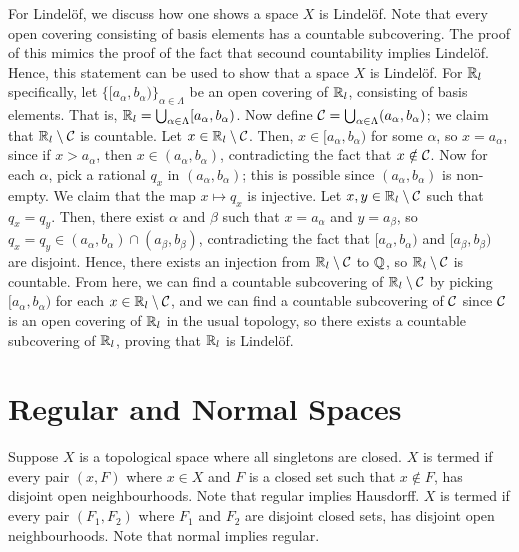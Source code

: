 For Lindel\"of, we discuss how one shows a space $X$ is Lindel\"of. Note that every open covering consisting of basis elements has a countable subcovering. The proof of this mimics the proof of the fact that secound countability implies Lindel\"of. Hence, this statement can be used to show that a space $X$ is Lindel\"of. For $\mathbb{R}_{l}$ specifically, let $\{[a_{\alpha},b_{\alpha})\}_{\alpha \in \Lambda}$ be an open covering of $\mathbb{R}_{l}$, consisting of basis elements. That is, $\mathbb{R}_{l} = \bigcup_{\alpha \in \Lambda} [a_{\alpha},b_{\alpha})$. Now define $\mathcal{C} = \bigcup_{\alpha \in \Lambda} (a_{\alpha},b_{\alpha})$; we claim that $\mathbb{R}_{l} \setminus \mathcal{C}$ is countable. Let $x \in \mathbb{R}_{l} \setminus \mathcal{C}$. Then, $x \in [a_{\alpha},b_{\alpha})$ for some $\alpha$, so $x = a_{\alpha}$, since if $x > a_{\alpha}$, then $x \in (a_{\alpha},b_{\alpha})$, contradicting the fact that $x \notin \mathcal{C}$. Now for each $\alpha$, pick a rational $q_{x}$ in $(a_{\alpha},b_{\alpha})$; this is possible since $(a_{\alpha},b_{\alpha})$ is non-empty. We claim that the map $x \mapsto q_{x}$ is injective. Let $x,y \in \mathbb{R}_{l} \setminus \mathcal{C}$ such that $q_{x} = q_{y}$. Then, there exist $\alpha$ and $\beta$ such that $x = a_{\alpha}$ and $y = a_{\beta}$, so $q_{x} = q_{y} \in (a_{\alpha},b_{\alpha}) \cap (a_{\beta},b_{\beta})$, contradicting the fact that $[a_{\alpha},b_{\alpha})$ and $[a_{\beta},b_{\beta})$ are disjoint. Hence, there exists an injection from $\mathbb{R}_{l} \setminus \mathcal{C}$ to $\mathbb{Q}$, so $\mathbb{R}_{l} \setminus \mathcal{C}$ is countable. From here, we can find a countable subcovering of $\mathbb{R}_{l} \setminus \mathcal{C}$ by picking $[a_{\alpha},b_{\alpha})$ for each $x \in \mathbb{R}_{l} \setminus \mathcal{C}$, and we can find a countable subcovering of $\mathcal{C}$ since $\mathcal{C}$ is an open covering of $\mathbb{R}_{l}$ in the usual topology, so there exists a countable subcovering of $\mathbb{R}_{l}$, proving that $\mathbb{R}_{l}$ is Lindel\"of.

\section{Regular and Normal Spaces}

\begin{definition}
    Suppose $X$ is a topological space where all singletons are closed. $X$ is termed  if every pair $(x,F)$ where $x \in X$ and $F$ is a closed set such that $x \notin F$, has disjoint open neighbourhoods. Note that regular implies Hausdorff. $X$ is termed  if every pair $(F_{1},F_{2})$ where $F_{1}$ and $F_{2}$ are disjoint closed sets, has disjoint open neighbourhoods. Note that normal implies regular.
\end{definition}

